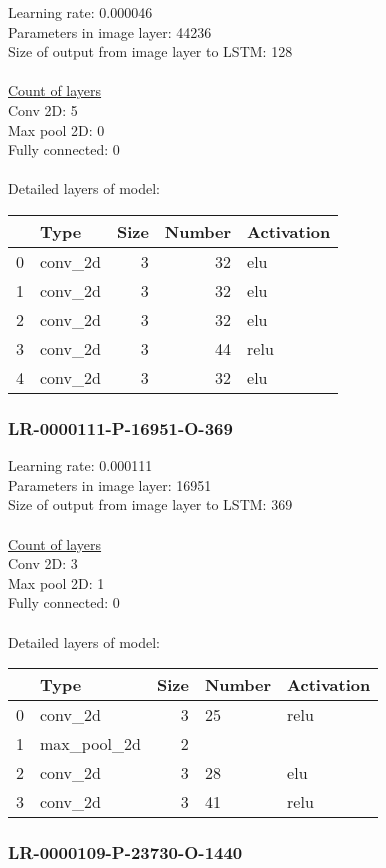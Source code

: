 Learning rate: 0.000046
\\Parameters in image layer: 44236
\\Size of output from image layer to LSTM: 128
\\\\\underline{Count of layers} 
\\Conv 2D:           5\\Max pool 2D:      0\\Fully connected:  0
\\\\Detailed layers of model: \\\begin{tabular}{rlrrl}
\hline
    & Type    &   Size &   Number & Activation   \\
\hline
  0 & conv\_2d &      3 &       32 & elu          \\
  1 & conv\_2d &      3 &       32 & elu          \\
  2 & conv\_2d &      3 &       32 & elu          \\
  3 & conv\_2d &      3 &       44 & relu         \\
  4 & conv\_2d &      3 &       32 & elu          \\
\hline
\end{tabular}\subsubsection*{LR-0000111-P-16951-O-369}
Learning rate: 0.000111
\\Parameters in image layer: 16951
\\Size of output from image layer to LSTM: 369
\\\\\underline{Count of layers} 
\\Conv 2D:           3\\Max pool 2D:      1\\Fully connected:  0
\\\\Detailed layers of model: \\\begin{tabular}{rlrll}
\hline
    & Type        &   Size & Number   & Activation   \\
\hline
  0 & conv\_2d     &      3 & 25       & relu         \\
  1 & max\_pool\_2d &      2 &          &              \\
  2 & conv\_2d     &      3 & 28       & elu          \\
  3 & conv\_2d     &      3 & 41       & relu         \\
\hline
\end{tabular}\subsubsection*{LR-0000109-P-23730-O-1440}
